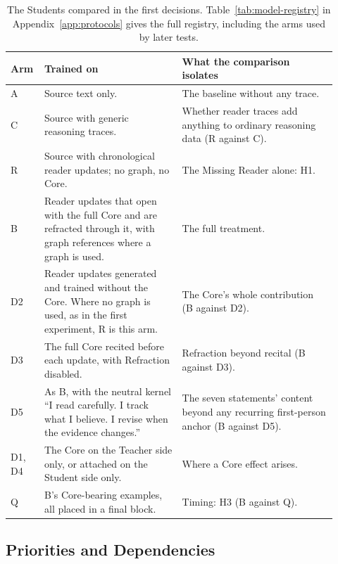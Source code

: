 \documentclass[11pt]{article}
\begin{document}
\begin{table}[htbp]
\centering
\small
\caption{The Students compared in the first decisions. Table~\ref{tab:model-registry} in Appendix~\ref{app:protocols} gives the full registry, including the arms used by later tests.}
\label{tab:first-arms}
\begin{tabular}{@{}p{0.07\linewidth}p{0.40\linewidth}p{0.45\linewidth}@{}}
\toprule
\textbf{Arm} & \textbf{Trained on} & \textbf{What the comparison isolates} \\
\midrule
A & Source text only. & The baseline without any trace. \\
C & Source with generic reasoning traces. & Whether reader traces add anything to ordinary reasoning data (R against C). \\
R & Source with chronological reader updates; no graph, no Core. & The Missing Reader alone: H1. \\
B & Reader updates that open with the full Core and are refracted through it, with graph references where a graph is used. & The full treatment. \\
D2 & Reader updates generated and trained without the Core. Where no graph is used, as in the first experiment, R is this arm. & The Core's whole contribution (B against D2). \\
D3 & The full Core recited before each update, with Refraction disabled. & Refraction beyond recital (B against D3). \\
D5 & As B, with the neutral kernel \enquote{I read carefully. I track what I believe. I revise when the evidence changes.} & The seven statements' content beyond any recurring first-person anchor (B against D5). \\
D1, D4 & The Core on the Teacher side only, or attached on the Student side only. & Where a Core effect arises. \\
Q & B's Core-bearing examples, all placed in a final block. & Timing: H3 (B against Q). \\
\bottomrule
\end{tabular}
\end{table}

\subsection{Priorities and Dependencies}\label{sec:test-priorities}
\end{document}
